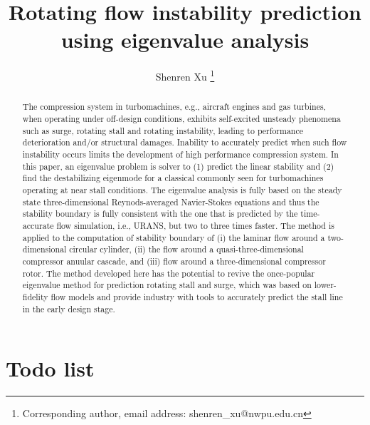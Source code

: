 \documentclass[journal,final]{new-aiaa}
\title{Rotating flow instability prediction using eigenvalue analysis}
\author[1]{Shenren Xu	
\footnote{ Corresponding author, email address: shenren\_xu@nwpu.edu.cn}}
\affil[1]{School of Power and Energy, 
	Northwestern Polytechnical University, Xi'an, 710072, China}
\begin{document}
\maketitle

\begin{abstract}
The compression system in turbomachines, e.g.,  aircraft engines and gas turbines,
when operating under off-design conditions, exhibits self-excited unsteady phenomena
such as surge, rotating stall and rotating instability, leading to performance deterioration
and/or structural damages. Inability to accurately predict when such flow instability occurs
limits the development of high performance compression system. In this paper,
an eigenvalue problem is solver to (1) predict the linear stability and (2) find the
destabilizing eigenmode for a classical 
commonly seen for turbomachines operating at near stall conditions. The eigenvalue
analysis is fully based on the steady state three-dimensional Reynods-averaged
Navier-Stokes equations and thus the stability boundary is fully consistent with
the one that is predicted by the time-accurate flow simulation, i.e., URANS, but
two to three times faster.
The method is applied to the computation of stability boundary of
(i) the laminar flow around a two-dimensional circular cylinder,
(ii) the flow around a quasi-three-dimensional compressor anuular cascade, 
and 
(iii) flow around a three-dimensional compressor rotor.
The method developed here has the potential to revive
the once-popular eigenvalue method for prediction rotating stall and surge, which
was based on lower-fidelity flow models and provide industry with tools to
accurately predict the stall line in the early design stage.
\end{abstract}

%

\section{{\color{red}Todo list}}
\end{document}
